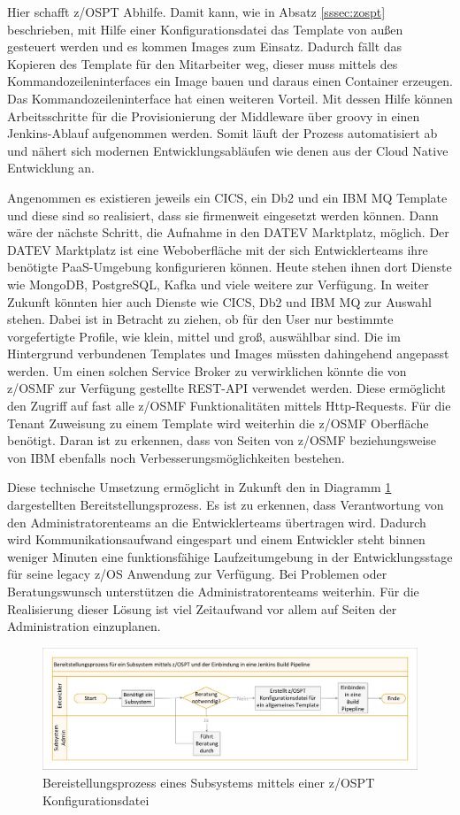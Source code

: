 Hier schafft z/OSPT Abhilfe.
Damit kann, wie in Absatz \ref{sssec:zospt} beschrieben, mit Hilfe einer Konfigurationsdatei das Template von außen gesteuert werden und es kommen Images zum Einsatz.
Dadurch fällt das Kopieren des Template für den Mitarbeiter weg, dieser muss mittels des Kommandozeileninterfaces ein Image bauen und daraus einen Container erzeugen.
Das Kommandozeileninterface hat einen weiteren Vorteil.
Mit dessen Hilfe können Arbeitsschritte für die Provisionierung der Middleware über groovy in einen Jenkins-Ablauf aufgenommen werden.
Somit läuft der Prozess automatisiert ab und nähert sich modernen Entwicklungsabläufen wie denen aus der Cloud Native Entwicklung an.

Angenommen es existieren jeweils ein CICS, ein Db2 und ein IBM MQ Template und diese sind so realisiert, dass sie firmenweit eingesetzt werden können.
Dann wäre der nächste Schritt, die Aufnahme in den \glqq DATEV Marktplatz\grqq, möglich.
Der \glqq DATEV Marktplatz\grqq{} ist eine Weboberfläche mit der sich Entwicklerteams ihre benötigte PaaS-Umgebung konfigurieren können.
Heute stehen ihnen dort Dienste wie MongoDB, PostgreSQL, Kafka und viele weitere zur Verfügung.
In weiter Zukunft könnten hier auch Dienste wie CICS, Db2 und IBM MQ zur Auswahl stehen.
Dabei ist in Betracht zu ziehen, ob für den User nur bestimmte vorgefertigte Profile, wie \glqq klein\grqq, \glqq mittel\grqq{} und \glqq groß\grqq, auswählbar sind.
Die im Hintergrund verbundenen Templates und Images müssten dahingehend angepasst werden.
Um einen solchen \glqq Service Broker\grqq{} zu verwirklichen könnte die von z/OSMF zur Verfügung gestellte REST-API verwendet werden.
Diese ermöglicht den Zugriff auf fast alle z/OSMF Funktionalitäten mittels Http-Requests.
Für die \glqq Tenant\grqq{} Zuweisung zu einem Template wird weiterhin die z/OSMF Oberfläche benötigt.
Daran ist zu erkennen, dass von Seiten von z/OSMF beziehungsweise von IBM ebenfalls noch Verbesserungsmöglichkeiten bestehen.

Diese technische Umsetzung ermöglicht in Zukunft den in Diagramm \ref{fig:proneu} dargestellten Bereitstellungsprozess.
Es ist zu erkennen, dass Verantwortung von den Administratorenteams an die Entwicklerteams übertragen wird.
Dadurch wird Kommunikationsaufwand eingespart und einem Entwickler steht binnen weniger Minuten eine funktionsfähige Laufzeitumgebung in der Entwicklungsstage für seine legacy z/OS Anwendung zur Verfügung.
Bei Problemen oder Beratungswunsch unterstützen die Administratorenteams weiterhin.
Für die Realisierung dieser Lösung ist viel Zeitaufwand vor allem auf Seiten der Administration einzuplanen.

\begin{figure}[ht!]
\centering
\includegraphics[width=\paperwidth,angle=90]{figures/swimlaneNeuerProzess.pdf}
\caption{Bereistellungsprozess eines Subsystems mittels einer z/OSPT Konfigurationsdatei}
\label{fig:proneu}
\end{figure}



